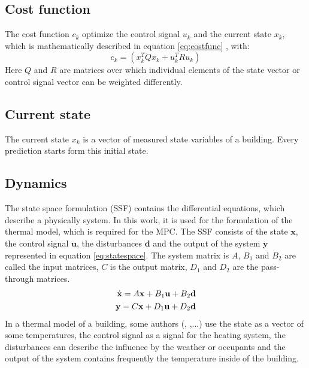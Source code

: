 \subsection{Cost function}
\label{subsection:costfunction}

    The cost function $c_k$ optimize the control signal $u_k$ and the current state $x_k$, which is mathematically described in equation
    \ref{eq:costfunc}
    , with:
    \begin{equation}
    \label{eq:c_k}
    c_k = (x_k^TQx_k+u_k^TRu_k)
    \end{equation}
    Here $Q$ and $R$ are matrices over which individual elements of the state vector or control signal vector can be weighted differently.  
    \cite{Kouvaritakis.2016}

\subsection{Current state}
\label{subsection:currentstate}

    The current state $x_k$ is a vector of measured state variables of a building. Every prediction starts form this initial state\cite{Oldewurtel.2012}.
    
\subsection{Dynamics}
\label{subsection:dynamics}
    
    The state space formulation (SSF) contains the differential equations, which describe a physically system. In this work, it is used for the formulation of the thermal model, which is required for the MPC. The SSF consists of the state $\textbf{x}$, the control signal $\textbf{u}$, the disturbances $\textbf{d}$ and the output of the system $\textbf{y}$ represented in equation \ref{eq:statespace}. The system matrix is $A$, $B_1$ and $B_2$ are called the input matrices, $C$ is the output matrix, $D_1$ and $D_2$ are the pass- through matrices.  
    \begin{align}
    \label{eq:statespace}
    \dot{\textbf{x}}=A\textbf{x}+B_1\textbf{u}+B_2\textbf{d}\\
    \textbf{y}=C\textbf{x}+D_1\textbf{u}+D_2\textbf{d} \notag
    \end{align}
    In a thermal model of a building, some authors (\cite{Hazyuk.2012}, \cite{Siroky.2011},...) use the state as a vector of some temperatures, the control signal as a signal for the heating system, the disturbances can describe the influence by the weather or occupants and the output of the system contains frequently the temperature inside of the building.
    


